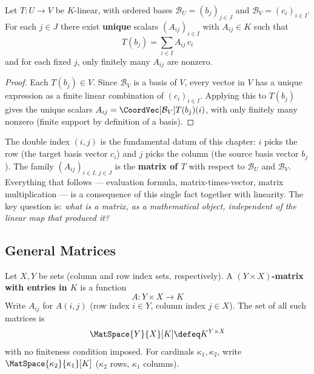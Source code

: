 \begin{proposition}
\label{prop:scalar-array}
    Let $T: U \to V$ be $K$-linear, with ordered bases $\mathcal{B}_U = (b_j)_{j \in J}$
    and $\mathcal{B}_V = (c_i)_{i \in I}$. For each $j \in J$ there exist \textbf{unique}
    scalars $(A_{ij})_{i \in I}$ with $A_{ij} \in K$ such that
    \[
        T(b_j) = \sum_{i \in I} A_{ij}\, c_i
    \]
    and for each fixed $j$, only finitely many $A_{ij}$ are nonzero.
\end{proposition}

\begin{proof}
    Each $T(b_j) \in V$. Since $\mathcal{B}_V$ is a basis of $V$, every vector in $V$ has a
    unique expression as a finite linear combination of $(c_i)_{i \in I}$. Applying this to
    $T(b_j)$ gives the unique scalars $A_{ij} = \CoordVec[\mathcal{B}_V]{T(b_j)}(i)$, with
    only finitely many nonzero (finite support by definition of a basis).
\end{proof}

\begin{remark}
    The double index $(i,j)$ is the fundamental datum of this chapter: $i$ picks the row
    (the target basis vector $c_i$) and $j$ picks the column (the source basis vector $b_j$).
    The family $(A_{ij})_{i \in I,\, j \in J}$ is the \textbf{matrix of $T$} with respect to
    $\mathcal{B}_U$ and $\mathcal{B}_V$. Everything that follows --- evaluation formula,
    matrix-times-vector, matrix multiplication --- is a consequence of this single fact
    together with linearity. The key question is: \emph{what is a matrix, as a mathematical
    object, independent of the linear map that produced it?}
\end{remark}


\subsection{General Matrices}

\begin{definition}
\label{def:mat-space}
    Let $X, Y$ be sets (column and row index sets, respectively). A \textbf{$(Y \times X)$-matrix
    with entries in $K$} is a function
    \[
        A: Y \times X \to K
    \]
    Write $A_{ij}$ for $A(i,j)$ (row index $i \in Y$, column index $j \in X$). The set of
    all such matrices is
    \[
        \MatSpace{Y}{X}[K] \defeq K^{Y \times X}
    \]
    with no finiteness condition imposed. For cardinals $\kappa_1, \kappa_2$, write
    $\MatSpace{\kappa_2}{\kappa_1}[K]$ ($\kappa_2$ rows, $\kappa_1$ columns).
\end{definition}

